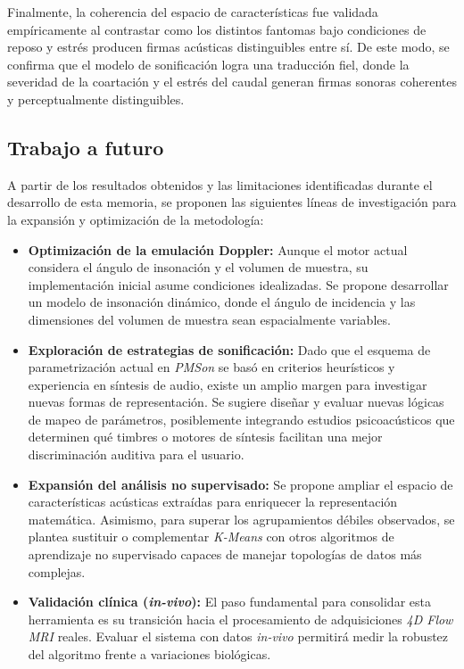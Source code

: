 Finalmente, la coherencia del espacio de características fue validada empíricamente al contrastar como los distintos fantomas bajo condiciones de reposo y estrés producen firmas acústicas distinguibles entre sí. De este modo, se confirma que el modelo de sonificación logra una traducción fiel, donde la severidad de la coartación y el estrés del caudal generan firmas sonoras coherentes y perceptualmente distinguibles.

\subsection{Trabajo a futuro}

A partir de los resultados obtenidos y las limitaciones identificadas durante el desarrollo de esta memoria, se proponen las siguientes líneas de investigación para la expansión y optimización de la metodología:

\begin{itemize}
    \item \textbf{Optimización de la emulación Doppler:} Aunque el motor actual considera el ángulo de insonación y el volumen de muestra, su implementación inicial asume condiciones idealizadas. Se propone desarrollar un modelo de insonación dinámico, donde el ángulo de incidencia y las dimensiones del volumen de muestra sean espacialmente variables.

    \item \textbf{Exploración de estrategias de sonificación:} Dado que el esquema de parametrización actual en \textit{PMSon} se basó en criterios heurísticos y experiencia en síntesis de audio, existe un amplio margen para investigar nuevas formas de representación. Se sugiere diseñar y evaluar nuevas lógicas de mapeo de  parámetros, posiblemente integrando estudios psicoacústicos que determinen qué timbres o motores de síntesis facilitan una mejor discriminación auditiva para el usuario.
    
    \item \textbf{Expansión del análisis no supervisado:} Se propone ampliar el espacio de características acústicas extraídas para enriquecer la representación matemática. Asimismo, para superar los agrupamientos débiles observados, se plantea sustituir o complementar \textit{K-Means} con otros algoritmos de aprendizaje no supervisado capaces de manejar topologías de datos más complejas.
    
    \item \textbf{Validación clínica (\textit{in-vivo}):} El paso fundamental para consolidar esta herramienta es su transición hacia el procesamiento de adquisiciones \textit{4D Flow MRI} reales. Evaluar el sistema con datos \textit{in-vivo} permitirá medir la robustez del algoritmo frente a variaciones biológicas.
\end{itemize}